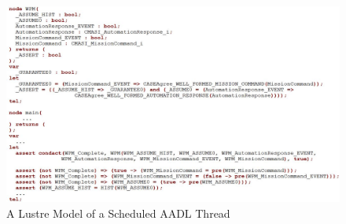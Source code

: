 \begin{figure}[ht!]
\centering
\includegraphics[width=130mm]{lustreCode5.jpg}
\caption{A Lustre Model of a Scheduled AADL Thread \label{WPMlustre}}
\end{figure}

%
%


  